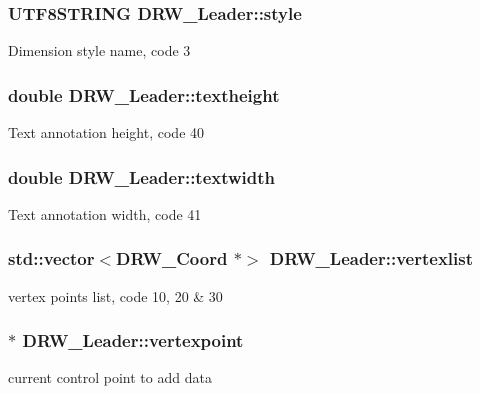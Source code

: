 \subsubsection[{style}]{\setlength{\rightskip}{0pt plus 5cm}U\+T\+F8\+S\+T\+R\+I\+N\+G D\+R\+W\+\_\+\+Leader\+::style}\label{class_d_r_w___leader_a7a4e898ceae92208a03e86f7857e78e0}
Dimension style name, code 3 \hypertarget{class_d_r_w___leader_a5d4c5d32e962710240fc6ffa392c951b}{}
\subsubsection[{textheight}]{\setlength{\rightskip}{0pt plus 5cm}double D\+R\+W\+\_\+\+Leader\+::textheight}\label{class_d_r_w___leader_a5d4c5d32e962710240fc6ffa392c951b}
Text annotation height, code 40 \hypertarget{class_d_r_w___leader_ab08450146f7f0658eca773a534d64be0}{}
\subsubsection[{textwidth}]{\setlength{\rightskip}{0pt plus 5cm}double D\+R\+W\+\_\+\+Leader\+::textwidth}\label{class_d_r_w___leader_ab08450146f7f0658eca773a534d64be0}
Text annotation width, code 41 \hypertarget{class_d_r_w___leader_a7aef5bd8c0202b0c6836e15552866fcd}{}
\subsubsection[{vertexlist}]{\setlength{\rightskip}{0pt plus 5cm}std\+::vector$<${\bf D\+R\+W\+\_\+\+Coord} $\ast$$>$ D\+R\+W\+\_\+\+Leader\+::vertexlist}\label{class_d_r_w___leader_a7aef5bd8c0202b0c6836e15552866fcd}
vertex points list, code 10, 20 \& 30 \hypertarget{class_d_r_w___leader_a06568734914212d4d5fca83114459a2a}{}
\subsubsection[{vertexpoint}]{$\ast$ D\+R\+W\+\_\+\+Leader\+::vertexpoint\hspace{0.3cm}{\ttfamily [private]}}\label{class_d_r_w___leader_a06568734914212d4d5fca83114459a2a}
current control point to add data \hypertarget{class_d_r_w___leader_a8c0f8d7ebce1a2f1a4cb6d367a0c6a0d}{}
